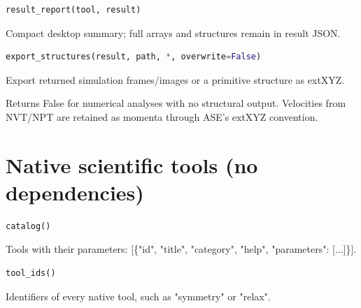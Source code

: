 \begin{samepage}

\begin{lstlisting}[language=Python]
result_report(tool, result)
\end{lstlisting}

Compact desktop summary; full arrays and structures remain in result JSON.

\end{samepage}



\begin{samepage}

\begin{lstlisting}[language=Python]
export_structures(result, path, *, overwrite=False)
\end{lstlisting}

Export returned simulation frames/\allowbreak{}images or a primitive structure as extXYZ.

Returns False for numerical analyses with no structural output. Velocities
from NVT/\allowbreak{}NPT are retained as momenta through ASE's extXYZ convention.

\end{samepage}



\section{Native scientific tools (no dependencies)}

\begin{samepage}

\begin{lstlisting}[language=Python]
catalog()
\end{lstlisting}

Tools with their parameters: [\{"id", "title", "category", "help", "parameters": [...]\}].

\end{samepage}



\begin{samepage}

\begin{lstlisting}[language=Python]
tool_ids()
\end{lstlisting}

Identifiers of every native tool, such as "symmetry" or "relax".

\end{samepage}



